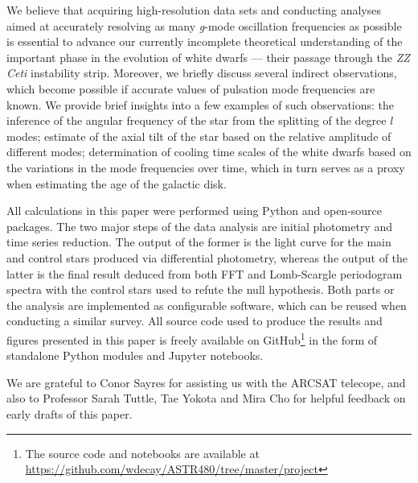 \documentclass{aastex631}
\begin{document}
We believe that acquiring high-resolution data sets and conducting
analyses aimed at accurately resolving as many \emph{g}-mode
oscillation frequencies as possible is essential to advance our
currently incomplete theoretical understanding of the important phase
in the evolution of white dwarfs --- their passage through the
\emph{ZZ Ceti} instability strip. Moreover, we briefly discuss several
indirect observations, which become possible if accurate values of
pulsation mode frequencies are known. We provide brief insights into a
few examples of such observations: the inference of the angular
frequency of the star from the splitting of the degree $l$ modes;
estimate of the axial tilt of the star based on the relative amplitude
of different modes; determination of cooling time scales of the white
dwarfs based on the variations in the mode frequencies over time,
which in turn serves as a proxy when estimating the age of the
galactic disk.

All calculations in this paper were performed using Python and
open-source packages. The two major steps of the data analysis are
initial photometry and time series reduction. The output of the former
is the light curve for the main and control stars produced via
differential photometry, whereas the output of the latter is the final
result deduced from both FFT and Lomb-Scargle periodogram spectra with
the control stars used to refute the null hypothesis. Both parts or
the analysis are implemented as configurable software, which can be
reused when conducting a similar survey. All source code used to
produce the results and figures presented in this paper is freely
available on GitHub\footnote{The source code and notebooks are
available at
\url{https://github.com/wdecay/ASTR480/tree/master/project}} in the
form of standalone Python modules and Jupyter notebooks.

We are grateful to Conor Sayres for assisting us with the ARCSAT
telecope, and also to Professor Sarah Tuttle, Tae Yokota and Mira Cho
for helpful feedback on early drafts of this paper.

{}

\end{document}
